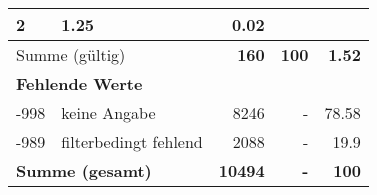 \begin{longtable}{lXrrr}
       \num{2} &
       \num[round-mode=places,round-precision=2]{1,25} &
         \num[round-mode=places,round-precision=2]{0,02} \\
     \midrule
     \multicolumn{2}{l}{Summe (gültig)} &
       \textbf{\num{160}} &
     \textbf{100} &
       \textbf{\num[round-mode=places,round-precision=2]{1,52}} \\
     \multicolumn{5}{l}{\textbf{Fehlende Werte}}\\
       -998 &
       keine Angabe &
         \num{8246} &
        - &
         \num[round-mode=places,round-precision=2]{78,58} \\
       -989 &
       filterbedingt fehlend &
         \num{2088} &
        - &
         \num[round-mode=places,round-precision=2]{19,9} \\
     \midrule
     \multicolumn{2}{l}{\textbf{Summe (gesamt)}} &
          \textbf{\num{10494}} &
        \textbf{-} &
        \textbf{100} \\
     \bottomrule
     \end{longtable}
     
